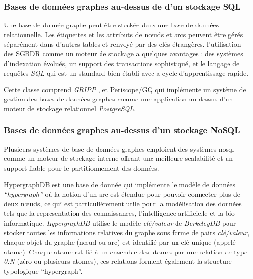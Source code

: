    \subsubsection{Bases de données graphes au-dessus de d'un stockage
      SQL}
    \label{sec:graphdb-over-sql}
    Une base de donnée graphe peut être stockée dans une base de
    données relationnelle. Les étiquettes et les attributs de nœuds et
    arcs peuvent être gérés séparément dans d'autres tables et renvoyé
    par des clés étrangères. l'utilisation des \acrshort{SGBDR} comme
    un moteur de stockage a quelques avantages : des systèmes
    d'indexation évolués, un support des transactions sophistiqué, et
    le langage de requêtes \emph{SQL} qui est un standard bien établi
    avec a cycle d'apprentissage rapide.\medskip

    

    Cette classe comprend \emph{GRIPP} \cite{trissl2007fast}, et
    Periscope/GQ \cite{tian2008periscope} qui implémente un système de
    gestion des bases de données graphes comme une application
    au-dessus d'un moteur de stockage relationnel \emph{PostgreSQL}.

    \newpage
    \subsubsection{Bases de données graphes au-dessus d'un stockage
      NoSQL}
    \label{sec:graphdb-over-nosql}
    Plusieurs systèmes de base de données graphes emploient des
    systèmes \acrshort{nosql} comme un moteur de stockage interne
    offrant une meilleure scalabilité et un support fiable pour le
    partitionnement des données.\bigskip

    \textsf{HypergraphDB} \cite{hypergraphdb,
      iordanov2010hypergraphdb} est une base de donnée qui implémente
    le modèle de données \emph{``hypergraph''} où la notion d'un arc
    est étendue pour pouvoir connecter plus de deux nœuds, ce qui est
    particulièrement utile pour la modélisation des données tels que
    la représentation des connaissances, l'intelligence artificielle
    et la bio-informatique. \emph{HypergraphDB} utilise le modèle
    \textit{clé/valeur} de \emph{BerkeleyDB} \cite{berkeleydb} pour
    stocker toutes les informations relatives du graphe sous forme de
    pairs \textit{clé/valeur}, chaque objet du graphe (nœud ou arc)
    est identifié par un clé unique (appelé atome). Chaque atome est
    lié à un ensemble des atomes par une relation de type \emph{0:N}
    (zéro ou plusieurs atomes), ces relations forment également la
    structure typologique ``hypergraph''.\bigskip

